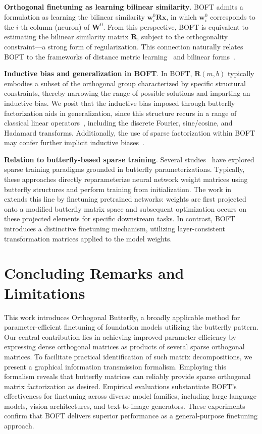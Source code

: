 \textbf{Orthogonal finetuning as learning bilinear similarity}. BOFT admits a formulation as learning the bilinear similarity $\bm{w}^0_i\bm{R}\bm{x}$, in which $\bm{w}^0_i$ corresponds to the $i$-th column (neuron) of $\bm{W}^0$. From this perspective, BOFT is equivalent to estimating the bilinear similarity matrix $\bm{R}$, subject to the orthogonality constraint—a strong form of regularization. This connection naturally relates BOFT to the frameworks of distance metric learning~\cite{xing2002distance} and bilinear forms~\cite{roman2005advanced}.

\textbf{Inductive bias and generalization in BOFT}. In BOFT, $\bm{R}(m,b)$ typically embodies a subset of the orthogonal group characterized by specific structural constraints, thereby narrowing the range of possible solutions and imparting an inductive bias. We posit that the inductive bias imposed through butterfly factorization aids in generalization, since this structure recurs in a range of classical linear operators~\cite{dao2019kaleidoscope}, including the discrete Fourier, sine/cosine, and Hadamard transforms. Additionally, the use of sparse factorization within BOFT may confer further implicit inductive biases~\cite{gunasekar2017implicit, li2018algorithmic, liu2019neural}.

\textbf{Relation to butterfly-based sparse training}. Several studies~\cite{dao2019learning,dao2019kaleidoscope,chen2022pixelated,dao2022monarch} have explored sparse training paradigms grounded in butterfly parameterizations. Typically, these approaches directly reparameterize neural network weight matrices using butterfly structures and perform training from initialization. The work in~\cite{dao2022monarch} extends this line by finetuning pretrained networks: weights are first projected onto a modified butterfly matrix space and subsequent optimization occurs on these projected elements for specific downstream tasks. In contrast, BOFT introduces a distinctive finetuning mechanism, utilizing layer-consistent transformation matrices applied to the model weights.



\section{Concluding Remarks and Limitations}

This work introduces Orthogonal Butterfly, a broadly applicable method for parameter-efficient finetuning of foundation models utilizing the butterfly pattern. Our central contribution lies in achieving improved parameter efficiency by expressing dense orthogonal matrices as products of several sparse orthogonal matrices. To facilitate practical identification of such matrix decompositions, we present a graphical information transmission formalism. Employing this formalism reveals that butterfly matrices can reliably provide sparse orthogonal matrix factorization as desired. Empirical evaluations substantiate BOFT’s effectiveness for finetuning across diverse model families, including large language models, vision architectures, and text-to-image generators. These experiments confirm that BOFT delivers superior performance as a general-purpose finetuning approach.

